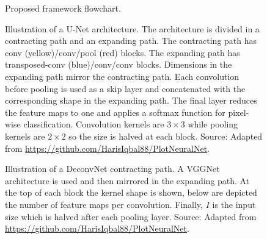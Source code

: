 \begin{figure}
    \centering
    \caption[Proposed framework flowchart]{Proposed framework flowchart.}
    \label{fig:flowchart}
\end{figure}

\begin{figure}
    \centering
    \resizebox{\linewidth}{!}{
    
    }
    \caption[Illustration of a U-Net architecture]{Illustration of a U-Net architecture. The architecture is divided in a contracting path and an expanding path. The contracting path has conv (yellow)/conv/pool (red) blocks. The expanding path has transposed-conv (blue)/conv/conv blocks. Dimensions in the expanding path mirror the contracting path. Each convolution before pooling is used as a skip layer and concatenated with the corresponding shape in the expanding path. The final layer reduces the feature maps to one and applies a softmax function for pixel-wise classification. Convolution kernels are $3\times 3$ while pooling kernels are $2\times 2$ so the size is halved at each block. Source: Adapted from \url{https://github.com/HarisIqbal88/PlotNeuralNet}.}
    \label{fig:unet}
\end{figure}

\begin{figure}
    \centering
    \resizebox{\linewidth}{!}{
    
    }
    \caption[Illustration of a DeconvNet contracting path]{Illustration of a DeconvNet contracting path. A VGGNet architecture is used and then mirrored in the expanding path. At the top of each block the kernel shape is shown, below are depicted the number of feature maps per convolution. Finally, $I$ is the input size which is halved after each pooling layer. Source: Adapted from \url{https://github.com/HarisIqbal88/PlotNeuralNet}.}
    \label{fig:deconv}
\end{figure}
    
